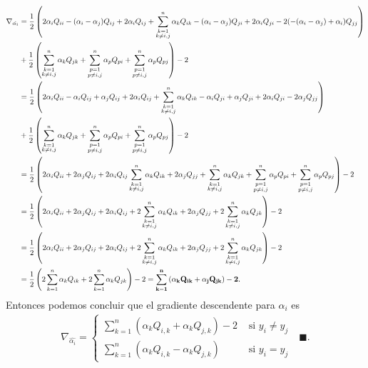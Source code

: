 \documentclass[11pt,letterpaper]{article}
\newcommand{\finf}{\blacksquare.}
\newcommand{\sumk}{\sum_{k=1}^n}
\begin{document}
\begin{enumerate}
\begin{align*}
\nabla_{\hat{\alpha_i}}&=\frac{1}{2}\left(2\alpha_iQ_{ii}-(\alpha_i-\alpha_j)Q_{ij}+2\alpha_iQ_{ij}+ \sum_{\substack{k=1\\ k\neq i,j}}^n  \alpha_k Q_{ik} -(\alpha_i -\alpha_j) Q_{ji}+2\alpha_iQ_{ji}-2(-(\alpha_i -\alpha_j)+\alpha_i)Q_{jj} \right)\\
&+\frac{1}{2}\left(\sum_{\substack{k=1\\ k\neq i,j}}^n \alpha_k Q_{jk}+\sum_{\substack{p=1 \\ p\neq i,j}}^n \alpha_pQ_{pi}+\sum_{\substack{p=1 \\ p\neq i,j}}^n \alpha_pQ_{pj} \right)-2\\
&= \frac{1}{2}\left(2\alpha_iQ_{ii}-\alpha_iQ_{ij} +\alpha_jQ_{ij}+2\alpha_iQ_{ij}+ \sum_{\substack{k=1\\ k\neq i,j}}^n  \alpha_k Q_{ik} -\alpha_iQ_{ji} +\alpha_jQ_{ji}+2\alpha_iQ_{ji}-2\alpha_jQ_{jj} \right)\\
&+\frac{1}{2}\left(\sum_{\substack{k=1\\ k\neq i,j}}^n \alpha_k Q_{jk}+\sum_{\substack{p=1 \\ p\neq i,j}}^n \alpha_pQ_{pi}+\sum_{\substack{p=1 \\ p\neq i,j}}^n \alpha_pQ_{pj} \right)-2\\
&=\frac{1}{2}\left(2\alpha_iQ_{ii}+2\alpha_j Q_{ij}+2\alpha_i Q_{ij} \sum_{\substack{k=1\\ k\neq i,j}}^n  \alpha_k Q_{ik} +2\alpha_jQ_{jj} +\sum_{\substack{k=1\\ k\neq i,j}}^n \alpha_k Q_{jk}+\sum_{\substack{p=1 \\ p\neq i,j}}^n \alpha_pQ_{pi}+\sum_{\substack{p=1 \\ p\neq i,j}}^n \alpha_pQ_{pj}\right)-2\\
&=\frac{1}{2}\left(2\alpha_iQ_{ii}+ 2\alpha_j Q_{ij}+2\alpha_i Q_{ij}+2\sum_{\substack{k=1\\ k\neq i,j}}^n  \alpha_k Q_{ik} +2\alpha_jQ_{jj} +2\sum_{\substack{k=1\\ k\neq i,j}}^n \alpha_k Q_{jk}\right)-2\\
&= \frac{1}{2}\left(2\alpha_iQ_{ii}+ 2\alpha_j Q_{ij}+2\alpha_i Q_{ij}+2\sum_{\substack{k=1\\ k\neq i,j}}^n  \alpha_k Q_{ik} +2\alpha_jQ_{jj} +2\sum_{\substack{k=1\\ k\neq i,j}}^n \alpha_k Q_{jk}\right)-2\\
&=\frac{1}{2}\left(2\sum_{\substack{k=1}}^n  \alpha_k Q_{ik}+2\sum_{\substack{k=1}}^n \alpha_k Q_{jk}\right)-2=\bf \sumk \left( \alpha_kQ_{ik}+\alpha_j Q_{jk}\right)-2.
\end{align*}
Entonces podemos concluir que el gradiente descendente para $\alpha_i$ es
\begin{align*}
\nabla_{\hat{\alpha_i}} = \left\{
\begin{array}{cc}
\sumk \left(\alpha_k Q_{i,k}+\alpha_kQ_{j,k}\right)-2& \text{ si } y_i\neq y_j\\ 
\sumk \left(\alpha_k Q_{i,k} -\alpha_kQ_{j,k}\right)& \text{ si } y_i= y_j \end{array}\right. \ \ \ \finf
\end{align*}


\end{enumerate}
\end{document}
